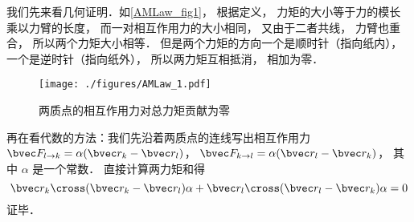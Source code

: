 我们先来看几何证明．如\autoref{AMLaw_fig1}， 根据定义， 力矩的大小等于力的模长乘以力臂的长度， 而一对相互作用力的大小相同， 又由于二者共线， 力臂也重合， 所以两个力矩大小相等． 但是两个力矩的方向一个是顺时针（指向纸内）， 一个是逆时针（指向纸外）， 所以两力矩互相抵消， 相加为零．

\begin{figure}[ht]
\centering
\texttt{[image: ./figures/AMLaw\_1.pdf]}
\caption{两质点的相互作用力对总力矩贡献为零}\label{AMLaw_fig1}
\end{figure}

再在看代数的方法：我们先沿着两质点的连线写出相互作用力 $\bvec F_{l\to k} = \alpha(\bvec r_k - \bvec r_l)$， $\bvec F_{k\to l} = \alpha(\bvec r_l - \bvec r_k)$， 其中 $\alpha$ 是一个常数． 直接计算两力矩和得
\begin{equation}
\bvec r_k \cross (\bvec r_k - \bvec r_l)\alpha + \bvec r_l \cross (\bvec r_l - \bvec r_k)\alpha = 0
\end{equation}
证毕．
